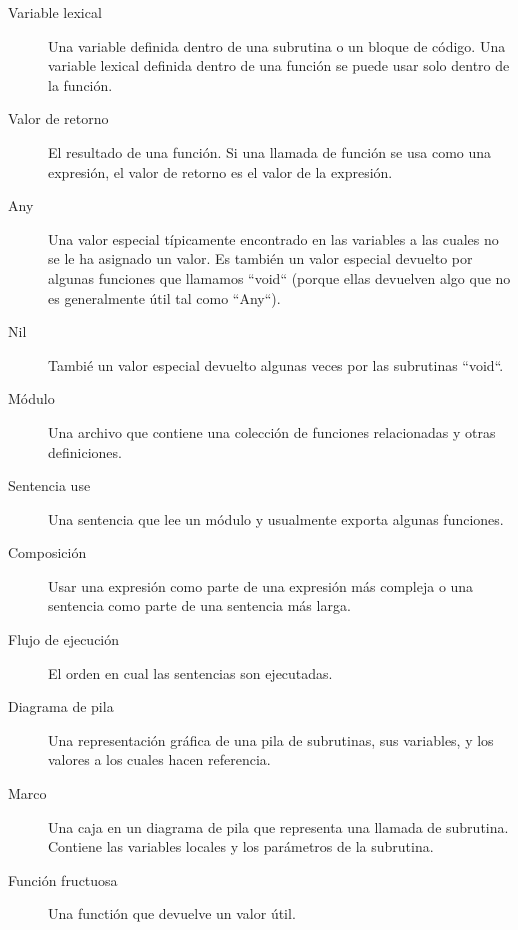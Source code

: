 \begin{description}
\item[Variable lexical] Una variable definida dentro de una
subrutina o un bloque de código. Una variable lexical definida
dentro de una función se puede usar solo dentro de la función.

\item[Valor de retorno]  El resultado de una función. Si una llamada
de función se usa como una expresión, el valor de retorno es el valor 
de la expresión.

\item[Any]  Una valor especial típicamente encontrado en 
las variables a las cuales no se le ha asignado un valor. Es 
también un valor especial devuelto por algunas funciones que 
llamamos ``void`` (porque ellas devuelven algo que no es
generalmente útil tal como ``Any``).

\item[Nil] Tambié un valor especial devuelto algunas veces
 por las subrutinas ``void``.

\item[Módulo] Una archivo que contiene una colección
de funciones relacionadas y otras definiciones.

\item[Sentencia use] Una sentencia que lee un módulo y 
usualmente exporta algunas funciones.

\item[Composición] Usar una expresión como parte de
una expresión más compleja o una sentencia como parte
de una sentencia más larga.

\item[Flujo de ejecución]  El orden en cual las sentencias
son ejecutadas.

\item[Diagrama de pila]  Una representación gráfica de una
pila de subrutinas, sus variables, y los valores a los cuales
hacen referencia.

\item[Marco]  Una caja en un diagrama de pila que representa una
llamada de subrutina. Contiene las variables locales y los 
parámetros de la subrutina.

\item[Función fructuosa] Una functión que devuelve un valor
útil.


\end{description}
